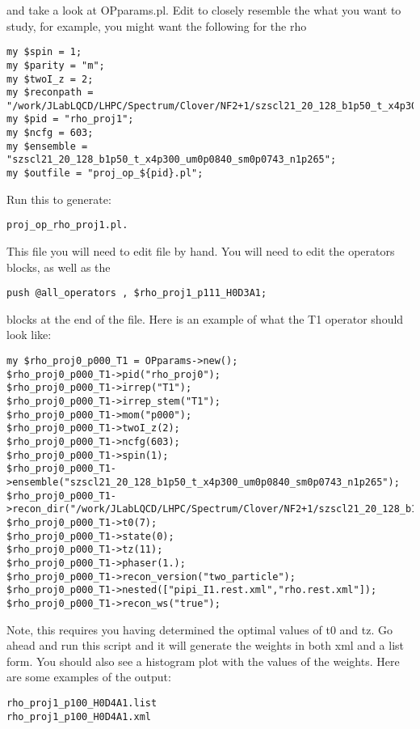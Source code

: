 \documentclass[prd,showpacs,showkeys,preprintnumbers,floatfix,
nofootinbib,superscriptaddress]{revtex4}
\begin{document}
and take a look at OPparams.pl. Edit to closely resemble the what you want to study, for example, you might want the following for the rho
\footnotesize
\begin{verbatim}
my $spin = 1;
my $parity = "m";
my $twoI_z = 2;
my $reconpath = "/work/JLabLQCD/LHPC/Spectrum/Clover/NF2+1/szscl21_20_128_b1p50_t_x4p300_um0p0840_sm0p0743_n1p265_per/meson_2pt";
my $pid = "rho_proj1";
my $ncfg = 603;
my $ensemble = "szscl21_20_128_b1p50_t_x4p300_um0p0840_sm0p0743_n1p265";
my $outfile = "proj_op_${pid}.pl";
\end{verbatim} 
\normalsize
Run this to generate:  
\footnotesize
\begin{verbatim}
proj_op_rho_proj1.pl. 
\end{verbatim}
 \normalsize
This file you will need to edit file by hand. You will need to edit the operators blocks, as well as the   
\footnotesize
\begin{verbatim}
push @all_operators , $rho_proj1_p111_H0D3A1; 
\end{verbatim} 
\normalsize
blocks at the end of the file. Here is an example of what the T1 operator should look like:
\footnotesize
\begin{verbatim}
my $rho_proj0_p000_T1 = OPparams->new();
$rho_proj0_p000_T1->pid("rho_proj0");
$rho_proj0_p000_T1->irrep("T1");
$rho_proj0_p000_T1->irrep_stem("T1");
$rho_proj0_p000_T1->mom("p000");
$rho_proj0_p000_T1->twoI_z(2);
$rho_proj0_p000_T1->ncfg(603);
$rho_proj0_p000_T1->spin(1);
$rho_proj0_p000_T1->ensemble("szscl21_20_128_b1p50_t_x4p300_um0p0840_sm0p0743_n1p265");
$rho_proj0_p000_T1->recon_dir("/work/JLabLQCD/LHPC/Spectrum/Clover/NF2+1/szscl21_20_128_b1p50_t_x4p300_um0p0840_sm0p0743_n1p265_per/redstar/rho/rho_ff/ws_larger/T1mm_wr");
$rho_proj0_p000_T1->t0(7);
$rho_proj0_p000_T1->state(0);
$rho_proj0_p000_T1->tz(11);
$rho_proj0_p000_T1->phaser(1.);
$rho_proj0_p000_T1->recon_version("two_particle");
$rho_proj0_p000_T1->nested(["pipi_I1.rest.xml","rho.rest.xml"]);
$rho_proj0_p000_T1->recon_ws("true");
\end{verbatim} 
\normalsize
Note, this requires you having determined the optimal values of t0 and tz. Go ahead and run this script and it will generate the weights in both xml and a list form. You should also see a histogram plot with the values of the weights. Here are some examples of the output:
\footnotesize
\begin{verbatim}
rho_proj1_p100_H0D4A1.list
rho_proj1_p100_H0D4A1.xml  
\end{verbatim} 
\normalsize
\end{document}
